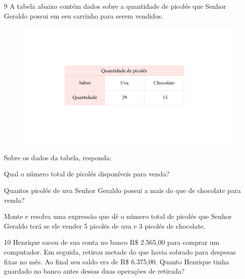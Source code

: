 \num{9} A tabela abaixo contém dados sobre a quantidade de picolés que
Senhor Geraldo possui em seu carrinho para serem vendidos.

\begin{figure}[htpb!]
\includegraphics[width=\textwidth]{../ilustracoes/MAT5/SAEB_5ANO_MAT_figura92.png}
\end{figure}


Sobre os dados da tabela, responda:

\begin{escolha}
\item
  Qual o número total de picolés disponíveis para venda?


\item
Quantos picolés de uva Senhor Geraldo possui a mais do que de chocolate
para venda?


\item
Monte e resolva uma expressão que dê o número total de picolés que Senhor
Geraldo terá se ele vender 5 picolés de uva e 3 picolés de chocolate.

\end{escolha}


\num{10} Henrique sacou de sua conta no banco R\$ 2.565,00 para comprar
um computador. Em seguida, retirou metade do que havia sobrado para
despesas fixas no mês. Ao final seu saldo era de R\$ 6.375,00. Quanto
Henrique tinha guardado no banco antes dessas duas operações de retirada?

